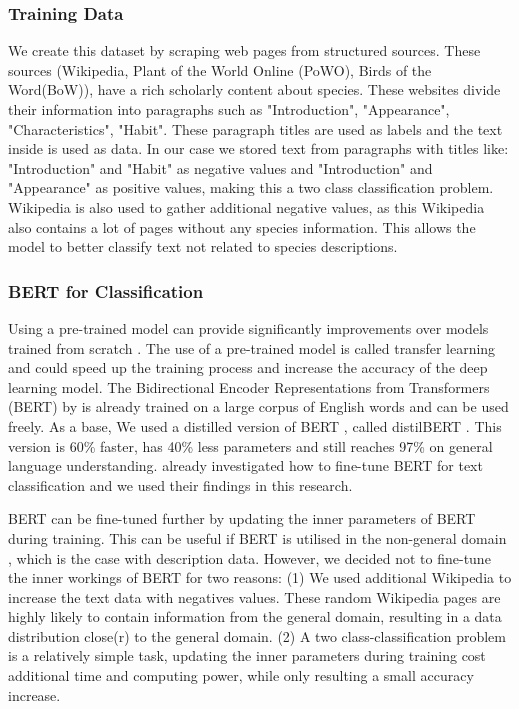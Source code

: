 \documentclass[a4paper, 12pt, oneside]{book} %
\begin{document}
\subsubsection{Training Data}
We create this dataset by scraping web pages from structured sources.
These sources (Wikipedia, Plant of the World Online (PoWO), Birds of the Word(BoW)), have a rich scholarly content about species.
These websites divide their information into paragraphs such as "Introduction", "Appearance", "Characteristics", "Habit".
These paragraph titles are used as labels and the text inside is used as data.
In our case we stored text from paragraphs with titles like:  "Introduction" and "Habit" as negative values and "Introduction" and "Appearance" as positive values, making this a two class classification problem. 
Wikipedia is also used to gather additional negative values, as this Wikipedia also contains a lot of pages without any species information.
This allows the model to better classify text not related to species descriptions.



\subsubsection{BERT for Classification}
Using a pre-trained model can provide significantly improvements over models trained from scratch \autocite{mikolov_distributed_2013}.
The use of a pre-trained model is called transfer learning and could speed up the training process and increase the accuracy of the deep learning model.
The Bidirectional Encoder Representations from Transformers (BERT) by \textcite{devlin_bert_2019} is already trained on a large corpus of English words and can be used freely.
As a base, We used a distilled version of BERT \autocite{devlin_bert_2019}, called distilBERT \autocite{sanh_distilbert_2020}. 
This version is 60\% faster, has 40\% less parameters and still reaches 97\% on general language understanding.
\textcite{sun_how_2020} already investigated how to fine-tune BERT for text classification and we used their findings in this research.

BERT can be fine-tuned further by updating the inner parameters of BERT during training. 
This can be useful if BERT is utilised in the non-general domain \autocite{devlin_bert_2019, sun_how_2020, sanh_distilbert_2020}, which is the case with description data.
However, we decided not to fine-tune the inner workings of BERT for two reasons: 
(1) We used additional Wikipedia to increase the text data with negatives values.
These random Wikipedia pages are highly likely to contain information from the general
domain, resulting in a  data distribution close(r) to the general domain.
(2) A two class-classification problem is a relatively simple task, updating the inner parameters during training cost additional time and computing power, while only resulting a small accuracy increase.
\end{document}
